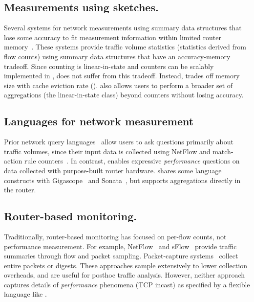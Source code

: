 \subsection{Measurements using sketches.} Several systems for network
measurements using summary data structures that lose some accuracy to fit
measurement information within limited router memory~\cite{univmon, flowradar,
counterbraids, dream, progme, opensketch}. These systems provide traffic volume
statistics (\ie statistics derived from flow counts) using summary data
structures that have an accuracy-memory tradeoff. Since counting is
linear-in-state and counters can be scalably implemented in \TheSystem,
\TheSystem does not suffer from this tradeoff. Instead, \TheSystem trades off
memory size with cache eviction rate ().  \TheSystem also allows
users to perform a broader set of aggregations (the linear-in-state class)
beyond counters without losing accuracy.

\subsection{Languages for network measurement} Prior network query
languages~\cite{gigascope, frenetic, path_query, streaming-monitoring} allow
users to ask questions primarily about traffic volumes, since their input data
is collected using NetFlow and match-action rule counters~\cite{openflow}. In
contrast, \TheSystem enables expressive {\em performance} questions on data
collected with purpose-built router hardware. \TheSystem shares some language
constructs with Gigascope~\cite{gigascope} and
Sonata~\cite{streaming-monitoring}, but supports aggregations directly in the
router.

\subsection{Router-based monitoring.} Traditionally, router-based monitoring has
focused on per-flow counts, not performance measurement. For example,
NetFlow~\cite{netflow} and sFlow~\cite{sflow} provide traffic summaries
through flow and packet sampling. Packet-capture systems~\cite{cisco-span,
niksun, netsight, everflow, pathdump, path_query} collect entire packets or
digests. These approaches sample extensively to lower collection
overheads, and are useful for posthoc traffic analysis. However, neither
approach captures details of {\em performance} phenomena (\eg TCP incast) as
specified by a flexible language like \TheSystem.

